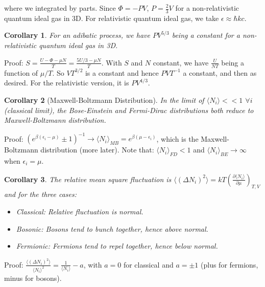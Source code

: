 \documentclass[a4paper]{article}
\theoremstyle{new}
\newtheorem{cor}{Corollary}[section]
\begin{document}
where we integrated by parts. Since $\Phi=-PV$, $P=\frac{2}{3}V$ for a non-relativistic quantum ideal gas in 3D. For relativistic quantum ideal gas, we take $\epsilon\approx\hbar kc$.
\begin{cor}
For an adibatic process, we have $PV^{5/3}$ being a constant for a non-relativistic quantum ideal gas in 3D.
\end{cor}
Proof: $S=\frac{U-\Phi-\mu N}{T}=\frac{5U/3-\mu N}{T}$. With $S$ and $N$ constant, we have $\frac{U}{NT}$ being a function of $\mu/T$. So $VT^{3/2}$ is a constant and hence $PVT^{-1}$ a constant, and then as desired. For the relativistic version, it is $PV^{4/3}$.
\begin{cor}[Maxwell-Boltzmann Distribution]
In the limit of $\langle N_i\rangle<<1$ $\forall i$ (classical limit), the Bose-Einstein and Fermi-Dirac distributions both reduce to Maxwell-Boltzmann distribution.
\end{cor}
Proof: $(e^{\beta(\epsilon_i-\mu)}\pm1)^{-1}\rightarrow\langle N_i\rangle_{MB}=e^{\beta(\mu-\epsilon_i)}$, which is the Maxwell-Boltzmann distribution (more later). Note that: $\langle N_i\rangle_{FD}<1$ and $\langle N_i\rangle_{BE}\rightarrow\infty$ when $\epsilon_i=\mu$.
\begin{cor}
The relative mean square fluctuation is $\langle(\Delta N_i)^2\rangle=kT(\frac{\partial\langle N_i\rangle}{\partial\mu})_{T,V}$ and for the three cases:
\begin{itemize}
    \item Classical: Relative fluctuation is normal.
    \item Bosonic: Bosons tend to bunch together, hence above normal.
    \item Fermionic: Fermions tend to repel together, hence below normal.
\end{itemize}
\end{cor}
Proof: $\frac{\langle(\Delta N_i)^2\rangle}{\langle N_i\rangle^2}=\frac{1}{\langle N_i\rangle}-a$, with $a=0$ for classical and $a=\pm1$ (plus for fermions, minus for bosons). 
\end{document}
